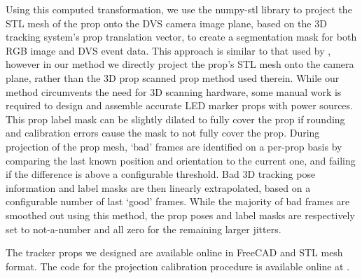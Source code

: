 \documentclass{article}
\begin{document}
Using this computed transformation, we use the numpy-stl library to project the STL mesh of the prop onto the DVS camera image plane, based on the 3D tracking system's prop translation vector, to create a segmentation mask for both RGB image and DVS event data. This approach is similar to that used by \cite{????}, however in our method we directly project the prop's STL mesh onto the camera plane, rather than the 3D prop scanned prop method used therein. While our method circumvents the need for 3D scanning hardware, some manual work is required to design and assemble accurate LED marker props with power sources. This prop label mask can be slightly dilated to fully cover the prop if rounding and calibration errors cause the mask to not fully cover the prop. During projection of the prop mesh, `bad' frames are identified on a per-prop basis by comparing the last known position and orientation to the current one, and failing if the difference is above a configurable threshold. Bad 3D tracking pose information and label masks are then linearly extrapolated, based on a configurable number of last `good' frames. While the majority of bad frames are smoothed out using this method, the prop poses and label masks are respectively set to not-a-number and all zero for the remaining larger jitters.

The tracker props we designed are available online \cite{???} in FreeCAD and STL mesh format. The code for the projection calibration procedure is available online at \cite{????}.
\end{document}
